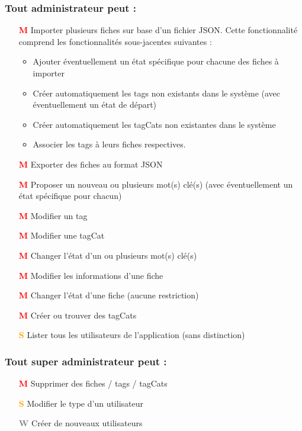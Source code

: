 \subsubsection*{Tout administrateur peut : }
\begin{itemize}
    \item[\textcolor{red}{\textbf{M}}] Importer plusieurs \glspl{fiche} sur base d'un fichier JSON.
        Cette fonctionnalité comprend les fonctionnalités sous-jacentes suivantes :
        \begin{itemize}
            \item Ajouter éventuellement un état spécifique pour chacune des \glspl{fiche} à importer
            \item Créer automatiquement les \glspl{tag} non existants dans le système (avec éventuellement un état de départ)
            \item Créer automatiquement les \glspl{tagCat} non existantes dans le système
            \item Associer les \glspl{tag} à leurs \glspl{fiche} respectives. 
        \end{itemize}
    \item[\textcolor{red}{\textbf{M}}] Exporter des \glspl{fiche} au format JSON
    \item[\textcolor{red}{\textbf{M}}] Proposer un nouveau ou plusieurs mot(s) clé(s) (avec éventuellement un état spécifique pour chacun)
    \item[\textcolor{red}{\textbf{M}}] Modifier un \gls{tag} 
    \item[\textcolor{red}{\textbf{M}}] Modifier une \gls{tagCat} 
    \item[\textcolor{red}{\textbf{M}}] Changer l'état d'un ou plusieurs mot(s) clé(s)
    \item[\textcolor{red}{\textbf{M}}] Modifier les informations d'une \gls{fiche} 
    \item[\textcolor{red}{\textbf{M}}] Changer l'état d'une \gls{fiche} (aucune restriction)
    \item[\textcolor{red}{\textbf{M}}] Créer ou trouver des \glspl{tagCat}
    \item[\textcolor{orange}{\textbf{S}}] Lister tous les utilisateurs de l'application (sans distinction)
\end{itemize}

\subsubsection*{Tout super administrateur peut : }
\begin{itemize}
    \item[\textcolor{red}{\textbf{M}}] Supprimer des \glspl{fiche} / \glspl{tag} / \glspl{tagCat}
    \item[\textcolor{orange}{\textbf{S}}] Modifier le type d'un utilisateur
    \item[\textcolor{gray}{\textbf{W}}] Créer de nouveaux utilisateurs
\end{itemize}
\pagebreak

